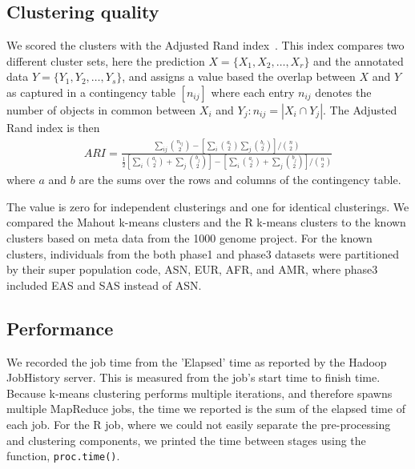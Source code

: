 \documentclass{bioinfo}
\begin{document}
\begin{methods}
\subsection*{Clustering quality}
We scored the clusters with the Adjusted Rand index~\cite{Hubert1985}. 
This index compares two different cluster sets, here the prediction $X = \{ X_1, X_2, \ldots , X_r \}$ and the annotated data $Y = \{ Y_1, Y_2, \ldots , Y_s \}$, and assigns a value based the overlap between $X$ and $Y$ as captured in a contingency table $\left[n_{ij}\right]$ where each entry $n_{ij}$ denotes the number of objects in common between $X_i$ and $Y_j : n_{ij}=|X_i \cap Y_j|$. 
The Adjusted Rand index is then 
{\tiny
\begin{eqnarray*}
ARI=\frac{\sum_{ij}{{n_{ij}\choose 2}} - \left[ \sum_{i}{{a_i\choose2}} \sum_{j}{{b_i\choose2}} \right] / {n\choose2}}{\frac{1}{2} \left[ \sum_{i}{{a_{i}\choose 2} + \sum_{j}{{b_{j}\choose 2}}} \right] - \left[ \sum_{i}{{a_{i}\choose 2} + \sum_{j}{{b_{j}\choose 2}}} \right] / {n\choose2}} 
\end{eqnarray*}
}
where $a$ and $b$ are the sums over the rows and columns of the contingency table.

The value is zero for independent clusterings and one for identical clusterings. 
We compared the Mahout k-means clusters and the R k-means clusters to the known clusters based on meta data from the 1000 genome project.
For the known clusters, individuals from the both phase1 and phase3 datasets were partitioned by their super population code, ASN, EUR, AFR, and AMR, where phase3 included EAS and SAS instead of ASN.



\subsection*{Performance}
We recorded the job time from the 'Elapsed' time as reported by the Hadoop JobHistory server. This is measured from the job's start time to finish time.
Because k-means clustering performs multiple iterations, and therefore spawns multiple MapReduce jobs, the time we reported is the sum of the elapsed time of each job.
For the R job, where we could not easily separate the pre-processing and clustering components, we printed the time between
stages using the function, \texttt{proc.time()}.

\end{methods}
\end{document}
